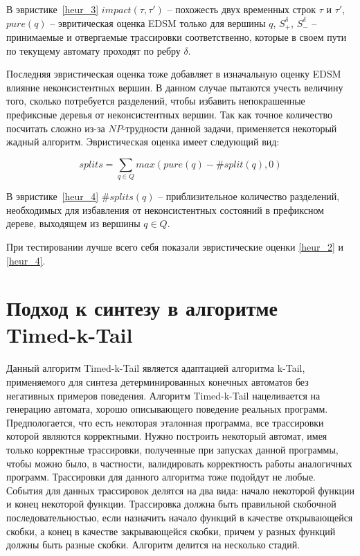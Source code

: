 \documentclass[times,specification,annotation]{itmo-student-thesis}
\begin{document}
В эвристике~\ref{heur_3} $impact(\tau, \tau')$ -- похожесть двух временных строк $\tau$ и $\tau'$, $pure(q)$ -- эвритическая оценка EDSM только для вершины $q$, 
$S^\delta_+$, $S^\delta_-$ -- принимаемые и отвергаемые трассировки соответственно, которые в своем пути по текущему автомату проходят по ребру $\delta$.

Последняя эвристическая оценка тоже добавляет в изначальную оценку EDSM влияние неконсистентных вершин. В данном случае пытаются учесть величину того,
сколько потребуется разделений, чтобы избавить непокрашенные префиксные деревья от неконсистентных вершин. Так как точное количество посчитать сложно из-за $NP$-трудности
данной задачи, применяется некоторый жадный алгоритм. Эвристическая оценка имеет следующий вид:

\begin{equation}
  splits = \mathop{\sum}\limits_{q \in Q}max(pure(q) - \#split(q), 0)
  \label{heur_4}
\end{equation}

В эвристике~\ref{heur_4} $\#splits(q)$ -- приблизительное количество разделений, необходимых для избавления от неконсистентных состояний в префиксном дереве, выходящем из вершины $q \in Q$.

При тестировании лучше всего себя показали эвристические оценки \ref{heur_2} и \ref{heur_4}.

\section{Подход к синтезу в алгоритме Timed-k-Tail}

Данный алгоритм Timed-k-Tail\cite{timed-k-tail} является адаптацией алгоритма k-Tail\cite{k-tail}, применяемого для синтеза детерминированных конечных автоматов без негативных примеров поведения. 
Алгоритм Timed-k-Tail нацеливается на генерацию автомата, хорошо описывающего поведение реальных программ. Предпологается, что есть некоторая эталонная программа, 
все трассировки которой являются корректными. Нужно построить некоторый автомат, имея только корректные трассировки, полученные при запусках данной программы, чтобы
можно было, в частности, валидировать корректность работы аналогичных программ. Трассировки для данного алгоритма тоже подойдут не любые.
События для данных трассировок делятся на два вида: начало некоторой функции и конец некоторой функции. Трассировка должна быть правильной скобочной последовательностью, если назначить 
начало функций в качестве открывающейся скобки, а конец в качестве закрывающейся скобки, причем у разных функций должны быть разные скобки.
Алгоритм делится на несколько стадий.
\end{document}
